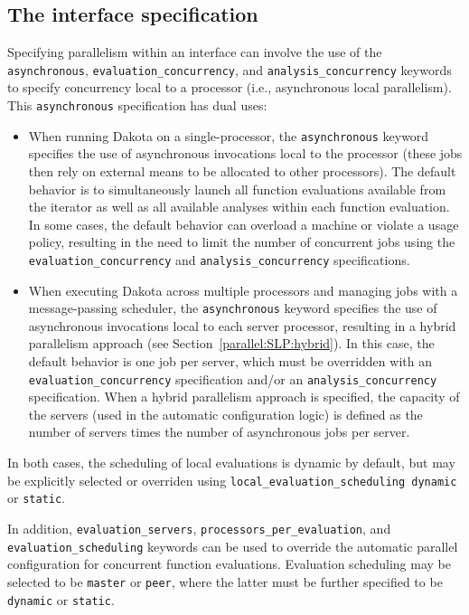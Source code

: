 \subsection{The interface specification}\label{parallel:spec:interface}

Specifying parallelism within an interface can involve the use of the
\texttt{asynchronous}, \texttt{evaluation\_concurrency}, and
\texttt{analysis\_concurrency} keywords to specify concurrency local
to a processor (i.e., asynchronous local parallelism). This
\texttt{asynchronous} specification has dual uses:

\begin{itemize}
\item When running Dakota on a single-processor, the
  \texttt{asynchronous} keyword specifies the use of asynchronous
  invocations local to the processor (these jobs then rely on external
  means to be allocated to other processors). The default behavior is
  to simultaneously launch all function evaluations available from the
  iterator as well as all available analyses within each function
  evaluation. In some cases, the default behavior can overload a
  machine or violate a usage policy, resulting in the need to limit
  the number of concurrent jobs using the
  \texttt{evaluation\_concurrency} and \texttt{analysis\_concurrency}
  specifications. 

\item When executing Dakota across multiple processors and managing
  jobs with a message-passing scheduler, the \texttt{asynchronous}
  keyword specifies the use of asynchronous invocations local to each
  server processor, resulting in a hybrid parallelism approach (see
  Section~\ref{parallel:SLP:hybrid}). In this case, the default
  behavior is one job per server, which must be overridden with an
  \texttt{evaluation\_concurrency} specification and/or an
  \texttt{analysis\_concurrency} specification. When a hybrid
  parallelism approach is specified, the capacity of the servers (used
  in the automatic configuration logic) is defined as the number of
  servers times the number of asynchronous jobs per server.
\end{itemize}

In both cases, the scheduling of local evaluations is dynamic by
default, but may be explicitly selected or overriden using
\texttt{local\_evaluation\_scheduling dynamic} or \texttt{static}.

In addition, \texttt{evaluation\_servers},
\texttt{processors\_per\_evaluation}, and
\texttt{evaluation\_scheduling} keywords can be used to override the
automatic parallel configuration for concurrent function
evaluations. Evaluation scheduling may be selected to be
\texttt{master} or \texttt{peer}, where the latter must be further
specified to be \texttt{dynamic} or \texttt{static}. 

